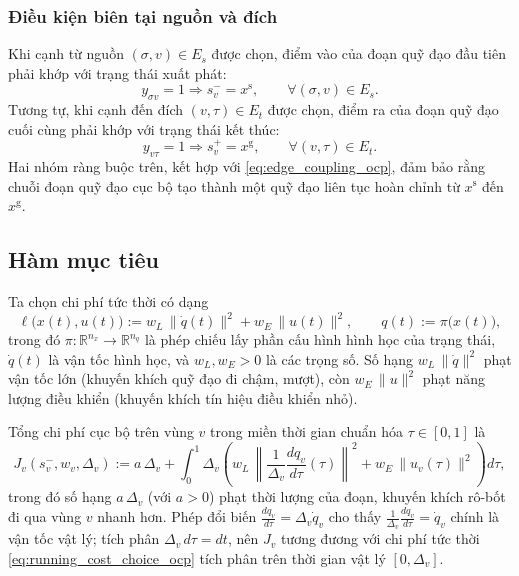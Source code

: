 \subsubsection{Điều kiện biên tại nguồn và đích}

Khi cạnh từ nguồn $(\sigma,v)\in E_s$ được chọn, điểm vào của đoạn quỹ đạo đầu tiên phải khớp với trạng thái xuất phát:
\[
y_{\sigma v}=1 \Longrightarrow s_v^-=x^{\mathrm s},
\qquad \forall(\sigma,v)\in E_s.
\]
Tương tự, khi cạnh đến đích $(v,\tau)\in E_t$ được chọn, điểm ra của đoạn quỹ đạo cuối cùng phải khớp với trạng thái kết thúc:
\[
y_{v\tau}=1 \Longrightarrow s_v^+=x^{\mathrm g},
\qquad \forall(v,\tau)\in E_t.
\]
Hai nhóm ràng buộc trên, kết hợp với \eqref{eq:edge_coupling_ocp}, đảm bảo rằng chuỗi đoạn quỹ đạo cục bộ tạo thành một quỹ đạo liên tục hoàn chỉnh từ $x^{\mathrm{s}}$ đến $x^{\mathrm{g}}$.

\subsection{Hàm mục tiêu}
\label{subsec:objective_ocp}

Ta chọn chi phí tức thời có dạng
\begin{equation}
\ell\bigl(x(t),u(t)\bigr)
:=
w_L\,\|\dot q(t)\|^2 + w_E\,\|u(t)\|^2,
\qquad
q(t):=\pi\bigl(x(t)\bigr),
\label{eq:running_cost_choice_ocp}
\end{equation}
trong đó $\pi:\mathbb{R}^{n_x}\to\mathbb{R}^{n_q}$ là phép chiếu lấy phần cấu hình hình học của trạng thái, $\dot q(t)$ là vận tốc hình học, và $w_L,w_E>0$ là các trọng số. Số hạng $w_L\,\|\dot q\|^2$ phạt vận tốc lớn (khuyến khích quỹ đạo đi chậm, mượt), còn $w_E\,\|u\|^2$ phạt năng lượng điều khiển (khuyến khích tín hiệu điều khiển nhỏ).

Tổng chi phí cục bộ trên vùng $v$ trong miền thời gian chuẩn hóa $\tau\in[0,1]$ là
\begin{equation}
J_v(s_v^-,w_v,\Delta_v)
:= a\,\Delta_v
+ \int_0^1 \Delta_v\!\left(
w_L\,\left\|\frac{1}{\Delta_v}\frac{d q_v}{d\tau}(\tau)\right\|^2
+
w_E\,\|u_v(\tau)\|^2
\right)\!d\tau,
\label{eq:local_cost_ocp}
\end{equation}
trong đó số hạng $a\,\Delta_v$ (với $a>0$) phạt thời lượng của đoạn, khuyến khích rô-bốt đi qua vùng $v$ nhanh hơn. Phép đổi biến $\frac{dq_v}{d\tau}=\Delta_v\dot q_v$ cho thấy $\frac{1}{\Delta_v}\frac{dq_v}{d\tau}=\dot q_v$ chính là vận tốc vật lý; tích phân $\Delta_v\,d\tau = dt$, nên $J_v$ tương đương với chi phí tức thời \eqref{eq:running_cost_choice_ocp} tích phân trên thời gian vật lý $[0,\Delta_v]$.

